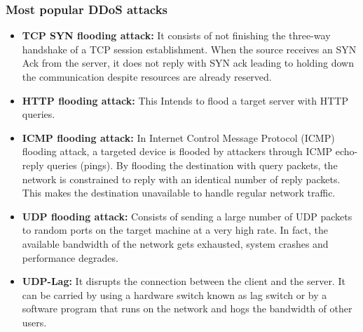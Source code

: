\subsubsection{Most popular DDoS attacks}

\begin{itemize}
    \item \textbf{TCP SYN flooding attack: }It consists of not finishing the three-way handshake of a TCP session establishment. When the source receives an SYN Ack from the server,  it does not reply with SYN ack leading to holding down the communication despite resources are already reserved. \cite{edgeiiot} \cite{ciciot2023}
    \item \textbf{HTTP flooding attack:} This Intends to flood a target server with HTTP queries. \cite{edgeiiot}
    \item \textbf{ICMP flooding attack:} In Internet Control Message Protocol (ICMP) flooding attack, a targeted device is flooded by attackers through ICMP echo-reply queries (pings). By flooding the destination with query packets, the network is constrained to reply with an identical number of reply packets. This makes the destination unavailable to handle regular network traffic.
    \item \textbf{UDP flooding attack:} Consists of sending a large number of UDP packets to random ports on the target machine at a very high rate. In fact, the available bandwidth of the network gets exhausted, system crashes and performance degrades. \cite{ddos2019}
    \item \textbf{UDP-Lag:} It disrupts the connection between the client and the server. It can be carried by using a hardware switch known as lag switch or by a software program that runs on the network and hogs the bandwidth of other users.\cite{ddos2019}
\end{itemize}





